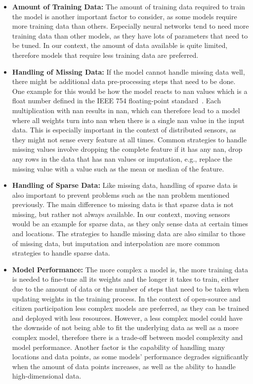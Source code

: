 \begin{itemize}
    \item \textbf{Amount of Training Data:} The amount of training data required to train the model is another important factor to consider, as some models require more training data than others. Especially neural networks tend to need more training data than other models, as they have lots of parameters that need to be tuned. In our context, the amount of data available is quite limited, therefore models that require less training data are preferred.
    \item \textbf{Handling of Missing Data:} If the model cannot handle missing data well, there might be additional data pre-processing steps that need to be done. One example for this would be how the model reacts to \gls{nan} values which is a float number defined in the IEEE 754 floating-point standard~\cite{ieee754}. Each multiplication with \gls{nan} results in \gls{nan}, which can therefore lead to a model where all weights turn into \gls{nan} when there is a single \gls{nan} value in the input data. This is especially important in the context of distributed sensors, as they might not sense every feature at all times. Common strategies to handle missing values involve dropping the complete feature if it has any \gls{nan}, drop any rows in the data that has \gls{nan} values or imputation, e.g., replace the missing value with a value such as the mean or median of the feature.
    \item \textbf{Handling of Sparse Data:} Like missing data, handling of sparse data is also important to prevent problems such as the \gls{nan} problem mentioned previously. The main difference to missing data is that sparse data is not missing, but rather not always available. In our context, moving sensors would be an example for sparse data, as they only sense data at certain times and locations. The strategies to handle missing data are also similar to those of missing data, but imputation and interpolation are more common strategies to handle sparse data.
    \item \textbf{Model Performance:} The more complex a model is, the more training data is needed to fine-tune all its weights and the longer it takes to train, either due to the amount of data or the number of steps that need to be taken when updating weights in the training process. In the context of open-source and citizen participation less complex models are preferred, as they can be trained and deployed with less resources. However, a less complex model could have the downside of not being able to fit the underlying data as well as a more complex model, therefore there is a trade-off between model complexity and model performance. Another factor is the capability of handling many locations and data points, as some models' performance degrades significantly when the amount of data points increases, as well as the ability to handle high-dimensional data.

\end{itemize}
